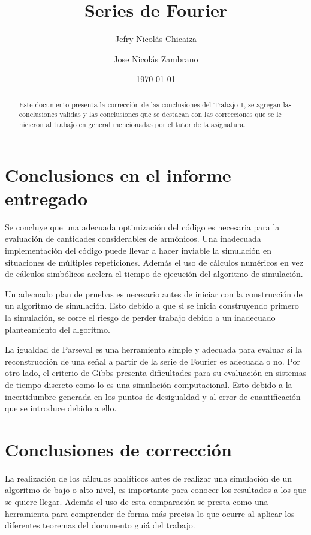 \documentclass[11pt]{article}
\date{\today}
\title{
    \fontsize{26}{26}\selectfont 
    \textbf{Series de Fourier}}
\author[1]{Jefry Nicolás Chicaiza}
\author[2]{Jose Nicolás Zambrano}
\affil[1]{jefryn@unicauca.edu.co}
\affil[2]{jnzambranob@unicauca.edu.co}
\date{}
\begin{document}
\maketitle
\thispagestyle{fancy}
\begin{abstract}
    Este documento presenta la corrección de las conclusiones del Trabajo 1, se agregan 
    las conclusiones validas y las conclusiones que se destacan con las correcciones que 
    se le hicieron al trabajo en general mencionadas por el tutor de la asignatura.       
\end{abstract}
\begin{multicols}{2}
\section*{Conclusiones en el informe entregado}
    Se concluye que una adecuada optimización del código es necesaria para la evaluación de cantidades 
    considerables de armónicos. Una inadecuada implementación del código puede llevar a hacer inviable 
    la simulación en situaciones de múltiples repeticiones. Además el uso de cálculos numéricos en vez 
    de cálculos simbólicos acelera el tiempo de ejecución del algoritmo de simulación.
    
    Un adecuado plan de pruebas es necesario antes de iniciar con la construcción de un algoritmo 
    de simulación. Esto debido a que si se inicia construyendo primero la simulación, se corre el 
    riesgo de perder trabajo debido a un inadecuado planteamiento del algoritmo.
    
    La igualdad de Parseval es una herramienta simple y adecuada para evaluar si la reconstrucción de 
    una señal a partir de la serie de Fourier es adecuada o no. Por otro lado, el criterio de Gibbs 
    presenta dificultades para su evaluación en sistemas de tiempo discreto como lo es una simulación 
    computacional. Esto debido a la incertidumbre generada en los puntos de desigualdad y al error de 
    cuantificación que se introduce debido a ello.

\section*{Conclusiones de corrección}
    La realización de los cálculos analíticos antes de realizar una simulación de un algoritmo de bajo
    o alto nivel, es importante para conocer los resultados a los que se quiere llegar. Además el uso 
    de esta comparación se presta como una herramienta para comprender de forma más precisa lo que 
    ocurre al aplicar los diferentes teoremas del documento guiá del trabajo.


\end{multicols}
\end{document}
